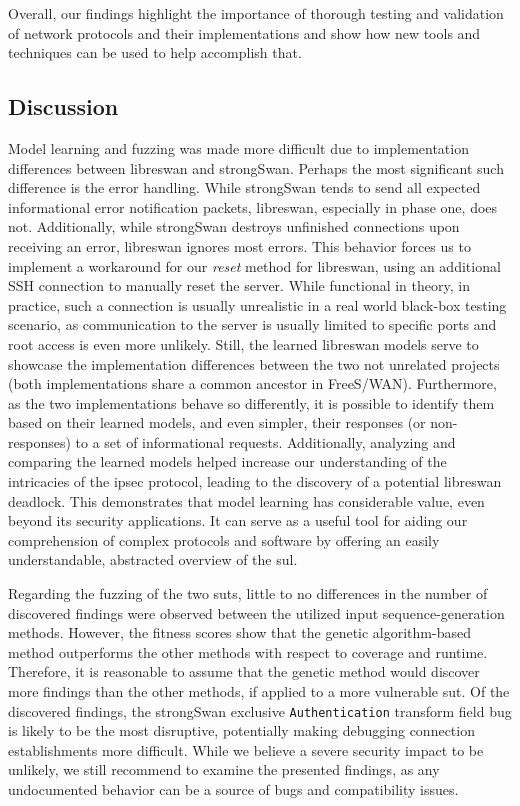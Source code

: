 Overall, our findings highlight the importance of thorough testing and validation of network protocols and their implementations and show how new tools and techniques can be used to help accomplish that.

\subsection{Discussion}
Model learning and fuzzing was made more difficult due to implementation differences between libreswan and strongSwan. Perhaps the most significant such difference is the error handling. While strongSwan tends to send all expected informational error notification packets, libreswan, especially in phase one, does not. Additionally, while strongSwan destroys unfinished connections upon receiving an error, libreswan ignores most errors. This behavior forces us to implement a workaround for our \emph{reset} method for libreswan, using an additional SSH connection to manually reset the server. While functional in theory, in practice, such a connection is usually unrealistic in a real world black-box testing scenario, as communication to the server is usually limited to specific ports and root access is even more unlikely. Still, the learned libreswan models serve to showcase the implementation differences between the two not unrelated projects (both implementations share a common ancestor in FreeS/WAN). Furthermore, as the two implementations behave so differently, it is possible to identify them based on their learned models, and even simpler, their responses (or non-responses) to a set of informational requests. Additionally, analyzing and comparing the learned models helped increase our understanding of the intricacies of the \ac{ipsec} protocol, leading to the discovery of a potential libreswan deadlock. This demonstrates that model learning has considerable value, even beyond its security applications. It can serve as a useful tool for aiding our comprehension of complex protocols and software by offering an easily understandable, abstracted overview of the \ac{sul}.

Regarding the fuzzing of the two \acp{sut}, little to no differences in the number of discovered findings were observed between the utilized input sequence-generation methods. However, the fitness scores show that the genetic algorithm-based method outperforms the other methods with respect to coverage and runtime. Therefore, it is reasonable to assume that the genetic method would discover more findings than the other methods, if applied to a more vulnerable \ac{sut}. Of the discovered findings, the strongSwan exclusive \texttt{Authentication} transform field bug is likely to be the most disruptive, potentially making debugging connection establishments more difficult. While we believe a severe security impact to be unlikely, we still recommend to examine the presented findings, as any undocumented behavior can be a source of bugs and compatibility issues. 


